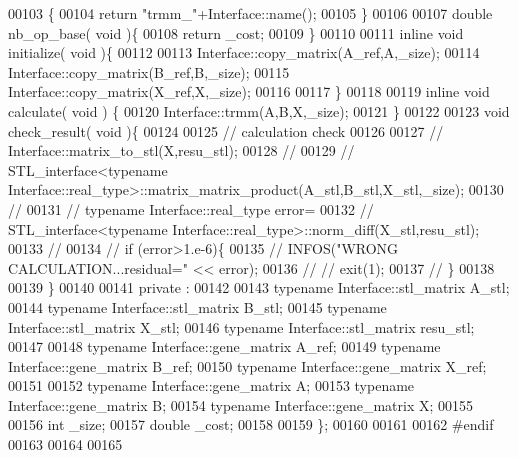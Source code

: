 \begin{DoxyCode}
00103   \{
00104     \textcolor{keywordflow}{return} \textcolor{stringliteral}{"trmm\_"}+Interface::name();
00105   \}
00106 
00107   \textcolor{keywordtype}{double} nb\_op\_base( \textcolor{keywordtype}{void} )\{
00108     \textcolor{keywordflow}{return} \_cost;
00109   \}
00110 
00111   \textcolor{keyword}{inline} \textcolor{keywordtype}{void} initialize( \textcolor{keywordtype}{void} )\{
00112 
00113     Interface::copy\_matrix(A\_ref,A,\_size);
00114     Interface::copy\_matrix(B\_ref,B,\_size);
00115     Interface::copy\_matrix(X\_ref,X,\_size);
00116 
00117   \}
00118 
00119   \textcolor{keyword}{inline} \textcolor{keywordtype}{void} calculate( \textcolor{keywordtype}{void} ) \{
00120       Interface::trmm(A,B,X,\_size);
00121   \}
00122 
00123   \textcolor{keywordtype}{void} check\_result( \textcolor{keywordtype}{void} )\{
00124 
00125     \textcolor{comment}{// calculation check}
00126 
00127 \textcolor{comment}{//     Interface::matrix\_to\_stl(X,resu\_stl);}
00128 \textcolor{comment}{//}
00129 \textcolor{comment}{//     STL\_interface<typename Interface::real\_type>::matrix\_matrix\_product(A\_stl,B\_stl,X\_stl,\_size);}
00130 \textcolor{comment}{//}
00131 \textcolor{comment}{//     typename Interface::real\_type error=}
00132 \textcolor{comment}{//       STL\_interface<typename Interface::real\_type>::norm\_diff(X\_stl,resu\_stl);}
00133 \textcolor{comment}{//}
00134 \textcolor{comment}{//     if (error>1.e-6)\{}
00135 \textcolor{comment}{//       INFOS("WRONG CALCULATION...residual=" << error);}
00136 \textcolor{comment}{// //       exit(1);}
00137 \textcolor{comment}{//     \}}
00138 
00139   \}
00140 
00141 private :
00142 
00143   \textcolor{keyword}{typename} Interface::stl\_matrix A\_stl;
00144   \textcolor{keyword}{typename} Interface::stl\_matrix B\_stl;
00145   \textcolor{keyword}{typename} Interface::stl\_matrix X\_stl;
00146   \textcolor{keyword}{typename} Interface::stl\_matrix resu\_stl;
00147 
00148   \textcolor{keyword}{typename} Interface::gene\_matrix A\_ref;
00149   \textcolor{keyword}{typename} Interface::gene\_matrix B\_ref;
00150   \textcolor{keyword}{typename} Interface::gene\_matrix X\_ref;
00151 
00152   \textcolor{keyword}{typename} Interface::gene\_matrix A;
00153   \textcolor{keyword}{typename} Interface::gene\_matrix B;
00154   \textcolor{keyword}{typename} Interface::gene\_matrix X;
00155 
00156   \textcolor{keywordtype}{int} \_size;
00157   \textcolor{keywordtype}{double} \_cost;
00158 
00159 \};
00160 
00161 
00162 \textcolor{preprocessor}{#endif}
00163 
00164 
00165 
\end{DoxyCode}
